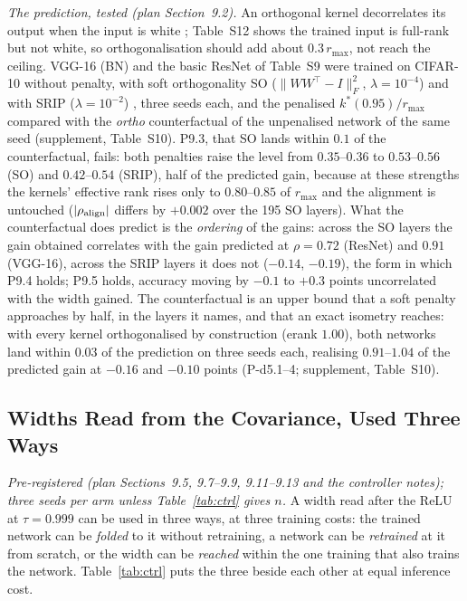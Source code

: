 \documentclass[10pt,journal,compsoc]{IEEEtran}
\begin{document}
\emph{The prediction, tested (plan Section~9.2).} An orthogonal kernel
decorrelates its output when the input is white \cite{huang2018own};
Table~S12 shows the trained input is full-rank but not
white, so orthogonalisation should add about $0.3\,r_{\max}$, not reach
the ceiling. VGG-16 (BN) and the basic ResNet of Table~S9 were trained on
CIFAR-10 without penalty, with soft orthogonality SO
($\|WW^{\top} - I\|_F^2$, $\lambda = 10^{-4}$) and with SRIP
($\lambda = 10^{-2}$) \cite{bansal2018orthogonality}, three seeds each,
and the penalised $k^*(0.95)/r_{\max}$ compared with the \emph{ortho}
counterfactual of the unpenalised network of the same seed
(supplement, Table~S10). P9.3, that SO lands within $0.1$ of the
counterfactual, fails: both penalties raise the level from $0.35$--$0.36$
to $0.53$--$0.56$ (SO) and $0.42$--$0.54$ (SRIP), half of the predicted
gain, because at these strengths the kernels' effective rank rises only
to $0.80$--$0.85$ of $r_{\max}$ and the alignment is untouched
($|\rho_{\rm align}|$ differs by $+0.002$ over the 195 SO layers). What
the counterfactual does predict is the \emph{ordering} of the gains:
across the SO layers the gain obtained correlates with the gain predicted
at $\rho = 0.72$ (ResNet) and $0.91$ (VGG-16), across the SRIP layers it
does not ($-0.14$, $-0.19$), the form in which P9.4 holds; P9.5 holds,
accuracy moving by $-0.1$ to $+0.3$ points uncorrelated with the width
gained. The counterfactual is an upper bound that a soft penalty
approaches by half, in the layers it names, and that an exact isometry
reaches: with every kernel orthogonalised by construction
\cite{huang2020oni} (erank $1.00$), both networks land within $0.03$ of
the prediction on three seeds each, realising $0.91$--$1.04$ of the
predicted gain at $-0.16$ and $-0.10$ points (P-d5.1--4; supplement,
Table~S10).


\subsection{Widths Read from the Covariance, Used Three Ways}
\label{sec:a18}

\emph{Pre-registered (plan Sections~9.5, 9.7--9.9, 9.11--9.13 and the
controller notes); three seeds per arm unless Table~\ref{tab:ctrl} gives $n$.} A width read after
the ReLU at $\tau = 0.999$ can be used in three ways, at three training
costs: the trained network can be \emph{folded} to it without retraining,
a network can be \emph{retrained} at it from scratch, or the width can be
\emph{reached} within the one training that also trains the network.
Table~\ref{tab:ctrl} puts the three beside each other at equal inference
cost.
\end{document}
